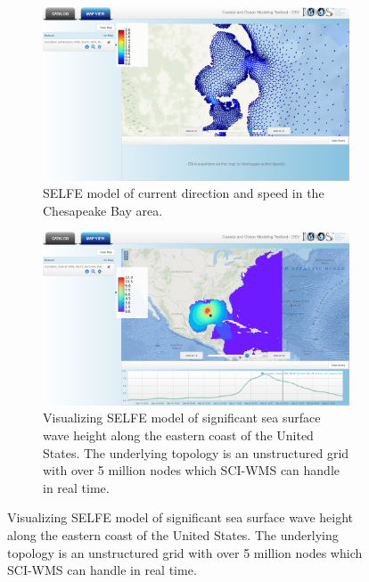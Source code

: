 \ifpltsub
\begin{figure}[ht!]
  \begin{subfigure}[t]{0.49\textwidth}
    \centering
    \includegraphics[width=\columnwidth]{../figs/vims_selfe_ubaratropic_vbaratropic_chesapeake_bay_crop_27_175_2825_1600}
    \caption{SELFE model of current
      direction and speed in the Chesapeake Bay area.}
    \label{fig:vims_selfe_chesapeake}
  \end{subfigure}
  \begin{subfigure}[t]{0.49\textwidth}
    \centering
    \includegraphics[width=\columnwidth]{../figs/inundation_tropical_VIMS_SELFE_hurricane_rita_2d_final_run_with_waves_sea_surface_wave_significant_height_crop_27_175_2825_1600}
    \caption{Visualizing SELFE model of significant sea surface wave height along the eastern coast of the United States. The underlying topology is an unstructured grid with over 5 million nodes which SCI-WMS can handle in real time.}
    \label{fig:vims_selfe_ssh}
  \end{subfigure}
\end{figure}
\else
